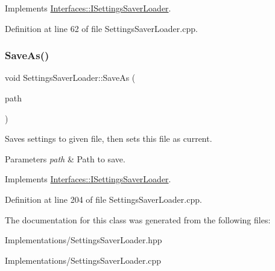 Implements \hyperlink{class_interfaces_1_1_i_settings_saver_loader_a4d8bdb2c5a27b5b0aa5ee4e55483f0de}{Interfaces\+::\+I\+Settings\+Saver\+Loader}.



Definition at line 62 of file Settings\+Saver\+Loader.\+cpp.

\mbox{\label{class_settings_saver_loader_a67b93496f8b0a0a779d783e967d93572}} 
\subsubsection{\texorpdfstring{Save\+As()}{SaveAs()}}
{\footnotesize\ttfamily void Settings\+Saver\+Loader\+::\+Save\+As (\begin{DoxyParamCaption}\item[{Q\+String}]{path }\end{DoxyParamCaption})\hspace{0.3cm}{\ttfamily [virtual]}}



Saves settings to given file, then sets this file as current. 


\begin{DoxyParams}{Parameters}
{\em path} & Path to save. \\
\hline
\end{DoxyParams}


Implements \hyperlink{class_interfaces_1_1_i_settings_saver_loader_a2d6a6dd6e5b6fe15e8b78af2e75725fc}{Interfaces\+::\+I\+Settings\+Saver\+Loader}.



Definition at line 204 of file Settings\+Saver\+Loader.\+cpp.



The documentation for this class was generated from the following files\+:\begin{DoxyCompactItemize}
\item 
Implementations/Settings\+Saver\+Loader.\+hpp\item 
Implementations/Settings\+Saver\+Loader.\+cpp\end{DoxyCompactItemize}

